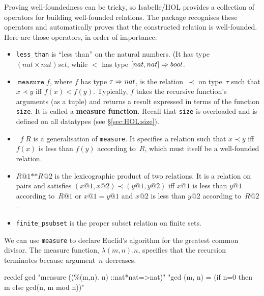 Proving well-foundedness can be tricky, so Isabelle/HOL provides a collection
of operators for building well-founded relations.  The package recognises
these operators and automatically proves that the constructed relation is
well-founded.  Here are those operators, in order of importance:
\begin{itemize}
\item \texttt{less_than} is ``less than'' on the natural numbers.
  (It has type $(nat\times nat)set$, while $<$ has type $[nat,nat]\Rightarrow bool$.
  
\item $\mathop{\mathtt{measure}} f$, where $f$ has type $\tau\Rightarrow nat$, is the
  relation~$\prec$ on type~$\tau$ such that $x\prec y$ iff $f(x)<f(y)$.
  Typically, $f$ takes the recursive function's arguments (as a tuple) and
  returns a result expressed in terms of the function \texttt{size}.  It is
  called a \textbf{measure function}.  Recall that \texttt{size} is overloaded
  and is defined on all datatypes (see {\S}\ref{sec:HOL:size}).
                                                    
\item $\mathop{\mathtt{inv_image}} f\;R$ is a generalisation of
  \texttt{measure}.  It specifies a relation such that $x\prec y$ iff $f(x)$
  is less than $f(y)$ according to~$R$, which must itself be a well-founded
  relation.

\item $R@1\texttt{**}R@2$ is the lexicographic product of two relations.  It
  is a relation on pairs and satisfies $(x@1,x@2)\prec(y@1,y@2)$ iff $x@1$
  is less than $y@1$ according to~$R@1$ or $x@1=y@1$ and $x@2$
  is less than $y@2$ according to~$R@2$.

\item \texttt{finite_psubset} is the proper subset relation on finite sets.
\end{itemize}

We can use \texttt{measure} to declare Euclid's algorithm for the greatest
common divisor.  The measure function, $\lambda(m,n). n$, specifies that the
recursion terminates because argument~$n$ decreases.
\begin{ttbox}
recdef gcd "measure ((\%(m,n). n) ::nat*nat=>nat)"
    "gcd (m, n) = (if n=0 then m else gcd(n, m mod n))"
\end{ttbox}

